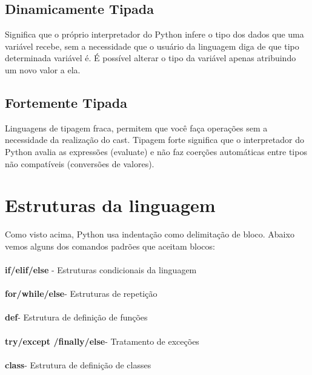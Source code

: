 \documentclass[12pt]{article}
\begin{document}
\subsection{Dinamicamente Tipada}

Significa que o próprio interpretador do Python infere o tipo dos dados que uma variável recebe, sem a necessidade que o usuário da linguagem diga de que tipo determinada variável é. É possível alterar o tipo da variável apenas atribuindo um novo valor a ela.

\subsection{Fortemente Tipada}

Linguagens de tipagem fraca, permitem que você faça operações sem a necessidade da realização do cast. Tipagem forte significa que o interpretador do Python avalia as expressões (evaluate) e não faz coerções automáticas entre tipos não compatíveis (conversões de valores).





\section{Estruturas da linguagem}

Como visto acima, Python usa indentação como delimitação de bloco.
Abaixo vemos alguns dos comandos padrões que aceitam blocos:
\\\\
\textbf{if/elif/else} - Estruturas condicionais da linguagem\\
\\
\textbf{for/while/else}- Estruturas de repetição\\
\\
\textbf{def}- Estrutura de definição de funções\\
\\
\textbf{try/except /finally/else}- Tratamento de exceções\\
\\
\textbf{class}- Estrutura de definição de classes




\end{document}

